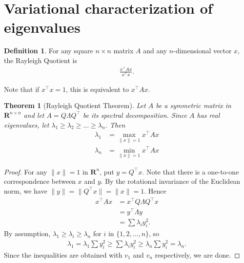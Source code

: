 \documentclass[]{article}
\theoremstyle{plain}
\newtheorem{thm}{Theorem}
\theoremstyle{definition}
\newtheorem{defn}{Definition}
\theoremstyle{remark}
\newcommand{\reals}{\mathbf{R}}
\begin{document}
\section{Variational characterization of
eigenvalues}\label{variational-characterization-of-eigenvalues}

\begin{defn}
For any square $n \times n$ matrix $A$ and any $n$-dimensional vector
$x$, the Rayleigh Quotient is
\begin{align*}
\frac{x^\top A x}{x^\top x}.
\end{align*}
\end{defn}

Note that if $x^\top x = 1$, this is equivalent to $x^\top A x$.

\begin{thm}[Rayleigh Quotient Theorem]
Let $A$ be a symmetric matrix in $\reals^{n \times n}$ and let
$A = Q\Lambda Q^\top$ be its spectral decomposition.  Since $A$
has real eigenvalues, let $\lambda_1 \ge \lambda_2 \ge \dots \ge \lambda_n$.
Then
\begin{align*}
\lambda_1 &= \max_{\|x\|=1} x^\top A x \\
\lambda_n &= \min_{\|x\|=1} x^\top A x
\end{align*}
\end{thm}
\begin{proof}
For any $\|x\|=1$ in $\reals^n$, put $y = Q^\top x$.  Note that there is
a one-to-one correspondence between $x$ and $y$.  By the rotational invariance
of the Euclidean norm, we have $\|y\| = \|Q^\top x\| = \|x\|= 1$. Hence
\begin{align*}
x^\top A x &= x^\top Q\Lambda Q^\top x \\
  &= y^\top \Lambda y \\
  &= \sum \lambda_i y_i^2.
\end{align*}
By assumption, $\lambda_1 \ge \lambda_i \ge \lambda_n$ for $i$ in
$\{1, 2, \dots, n\}$, so
\begin{align*}
\lambda_1 = \lambda_1 \sum y_i^2 \ge \sum \lambda_i y_i^2 \ge  \lambda_n \sum y_i^2 = \lambda_n.
\end{align*}
Since the inequalities are obtained with $v_1$ and $v_n$ respectively, we are
done.
\end{proof}
\end{document}
